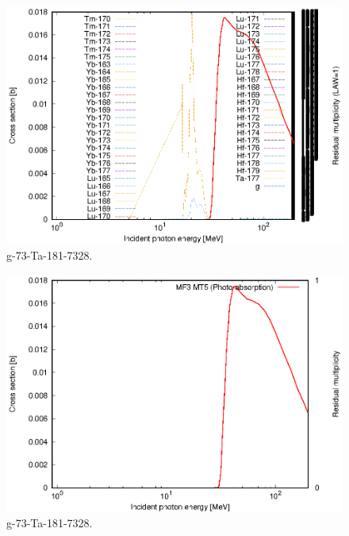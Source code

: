 \begin{figure}
 \includegraphics[width=\linewidth]{eps/g_73-Ta-181_7328.eps}
  \caption{g-73-Ta-181-7328.}
\end{figure}
\begin{figure}
 \includegraphics[width=\linewidth]{eps-law0/g_73-Ta-181_7328.eps}
 \caption{g-73-Ta-181-7328.}
\end{figure}
\newpage \clearpage

